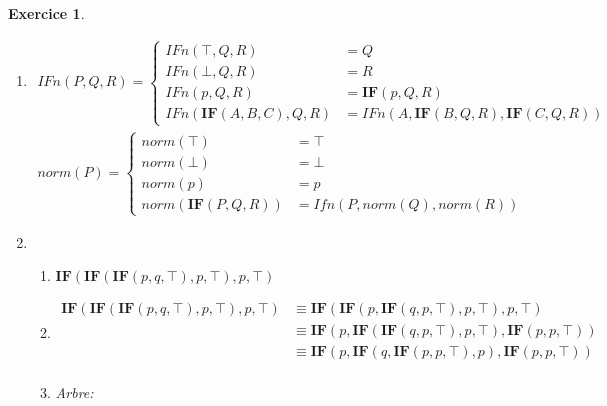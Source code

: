 \documentclass{article}
\theoremstyle{plain}
\newtheorem{exo}{Exercice}%
\begin{document}
\begin{exo}
\begin{enumerate}
    \item \begin{align*}
        IFn(P, Q, R) = \begin{cases}
            IFn(\top, Q, R) &= Q \\
            IFn(\bot, Q, R) &= R \\
            IFn(p, Q, R) &= \textbf{IF}(p, Q, R) \\
            IFn(\textbf{IF}(A, B, C), Q, R) &= IFn(A, 
                \textbf{IF}(B, Q, R), \textbf{IF}(C, Q, R))
        \end{cases}
    \end{align*}
    \begin{align*}
        norm(P) = \begin{cases}
            norm(\top) &= \top \\
            norm(\bot) &= \bot \\
            norm(p) &= p \\
            norm(\textbf{IF}(P, Q, R)) &= Ifn(P, norm(Q), norm(R))
        \end{cases}
    \end{align*}

    \item \begin{enumerate}
        \item $\textbf{IF}(\textbf{IF}(\textbf{IF}(p, q, \top), p, \top), p, \top)$
        \item \begin{align*}
            \textbf{IF}(\textbf{IF}(\textbf{IF}(p, q, \top), p, \top), p, \top) 
                &\equiv \textbf{IF}(\textbf{IF}(p, \textbf{IF}(q, p, \top), p, \top), p, \top) \\
                &\equiv \textbf{IF}(p, \textbf{IF}(
                        \textbf{IF}(q, p, \top), p, \top), \textbf{IF}(p, p, \top)) \\
                &\equiv \textbf{IF}(p, \textbf{IF}(
                    q, \textbf{IF}(p, p, \top), p), \textbf{IF}(p, p, \top)) \\
        \end{align*}

        \item Arbre:\\


\end{enumerate}
\end{enumerate}
\end{exo}
\end{document}
